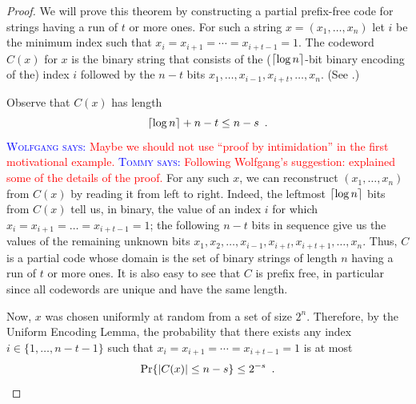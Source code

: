 \documentclass{patmorin}
\newcommand{\aremark}[3]{\textcolor{blue}{\textsc{#1 #2:}}
  \textcolor{red}{\textsf{#3}}}
\newcommand{\tommy}[2][says]{\aremark{Tommy}{#1}{#2}}
\newcommand{\wolfgang}[2][says]{\aremark{Wolfgang}{#1}{#2}}
\begin{document}
\begin{proof}
  We will prove this theorem by constructing a partial prefix-free
  code for strings having a run of $t$ or more ones.  For such a
  string $x=(x_1,\ldots,x_n)$ let $i$ be the minimum index such that
  $x_i=x_{i+1}=\cdots=x_{i+t-1}=1$. The codeword $C(x)$ for $x$ is the
  binary string that consists of the (${\lceil \log n \rceil}$-bit binary
  encoding of the) index $i$ followed by the $n-t$ bits
  $x_1,\ldots,x_{i-1},x_{i+t},\ldots,x_n$. (See .)

  Observe that $C(x)$ has length 
  \[
    {\lceil \log n \rceil} + n - t \le n-s \enspace .
  \]
  \wolfgang{Maybe we should not use ``proof by intimidation'' in the
    first motivational example.}  \tommy{Following Wolfgang's
    suggestion: explained some of the details of the proof.}  For any
  such $x$, we can reconstruct $(x_1,\ldots,x_n)$ from $C(x)$ by
  reading it from left to right. Indeed, the leftmost ${\lceil \log n \rceil}$
  bits from $C(x)$ tell us, in binary, the value of an index $i$ for
  which $x_i = x_{i + 1} = \dots = x_{i + t - 1} = 1$; the following
  $n - t$ bits in sequence give us the values of the remaining unknown
  bits
  $x_1, x_2, \dots, x_{i - 1}, x_{i + t}, x_{i + t + 1}, \dots,
  x_n$. Thus, $C$ is a partial code whose domain is the set of binary
  strings of length $n$ having a run of $t$ or more ones.  It is also
  easy to see that $C$ is prefix free, in particular since all
  codewords are unique and have the same length.

  Now, $x$ was chosen uniformly at random from a set of size $2^{n}$.
  Therefore, by the Uniform Encoding Lemma, the probability that there
  exists any index $i\in\{1,\ldots,n-t-1\}$ such that
  $x_i=x_{i+1}=\cdots=x_{i+t-1}=1$ is at most
  \[
    \Pr\{|C(x)|\le n-s\} \le 2^{-s} \enspace . \qedhere 
  \]
\end{proof}
\end{document}
